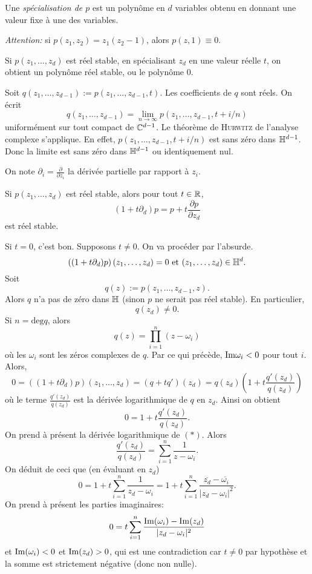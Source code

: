 Une \emph{spécialisation de $p$} est un polynôme en $d$ variables obtenu en
donnant une valeur fixe à une des variables.

\emph{Attention:} si $p(z_1, z_2) = z_1(z_2-1)$, alors $p(z, 1) \equiv 0$.

\begin{prop}
  \label{prop:2}
  Si $p(z_1, \ldots, z_d)$ est réel stable, en spécialisant $z_d$ en une valeur réelle $t$, on obtient un
  polynôme réel stable, ou le polynôme $0$.
\end{prop}

\begin{preuve}
  Soit $q(z_1, \ldots, z_{d-1}) := p(z_1, \ldots, z_{d-1}, t)$. Les coefficients de $q$ sont réels. On écrit
  \[q(z_1, \ldots, z_{d-1}) = \lim_{n \to \infty} p(z_1, \ldots, z_{d-1}, t + i/n) \]
  uniformément sur tout compact de $\mathbb{C}^{d-1}$. Le théorème de \textsc{Hurwitz} de l'analyse complexe
  s'applique. En effet, $p(z_1, \ldots, z_{d-1}, t + i/n)$ est sans zéro dans $\mathbb{H}^{d-1}$. Donc la limite est
  sans zéro dans $\mathbb{H}^{d-1}$ ou identiquement nul.
\end{preuve}


On note $\partial_i = \frac{\partial}{\partial z_i}$ la dérivée partielle par rapport à $z_i$.


\begin{prop}
  \label{prop:3}
  Si $p(z_1, \ldots, z_d)$ est réel stable, alors pour tout $t \in \mathbb{R}$, 
  \[ (1 + t \partial_d)p = p + t \frac{\partial p}{\partial z_d} \]
  est réel stable.
\end{prop}


\begin{preuve}
  Si $t = 0$, c'est bon. Supposons $t \neq 0$. On va procéder par l'absurde. 
  \[ \left( (1 + t\partial_d)p \right)(z_1, \ldots, z_d) = 0 \text{ et } (z_1, \ldots, z_d) \in \mathbb{H}^{d}.\]
  Soit 
  \[ q(z):= p(z_1, \ldots, z_{d-1}, z). \]
  Alors $q$ n'a pas de zéro dans $\mathbb{H}$ (sinon $p$ ne serait pas réel stable). En particulier, 
  \[ q(z_d) \neq 0. \]
  Si $n = \mathrm{deg} q$, alors 
  \[ q(z) = \prod_{i = 1}^{n} (z-\omega_i) \tag{$\ast$}\]
  où les $\omega_i$ sont les zéros complexes de $q$. Par ce qui précède, $\mathrm{Im} \omega_i < 0$ pour tout
  $i$. Alors, 
  \[ 0 = \left((1 + t \partial_d)p\right)(z_1, \ldots, z_d) = (q + tq')(z_d) = q(z_d) \left(1 + t
      \frac{q'(z_d)}{q(z_d)}\right) \]
  où le terme $\frac{q'(z_d)}{q(z_d)}$ est la dérivée logarithmique de $q$ en
  $z_d$. Ainsi on obtient 
  \[ 0 = 1 + t \frac{q'(z_d)}{q(z_d)}.\]
  On prend à présent la dérivée logarithmique de $(\ast)$. Alors 
  \[ \frac{q'(z_d)}{q(z_d)} = \sum_{i = 1}^{n} \frac{1}{z- \omega_i}. \]
  On déduit de ceci que (en évaluant en $z_d$)
  \[ 0 = 1 + t \sum_{i = 1}^{n} \frac{1}{z_d - \omega_i} = 1 + t \sum_{i = 1}^{n} \frac{\overline{z_d} -
      \overline{\omega_i}}{|z_d - \omega_i|^2}. \]
  On prend à présent les parties imaginaires: 
  \[ 0 = t \sum_{i = 1}^{n} \frac{\mathrm{Im}(\omega_i) - \mathrm{Im}(z_d)}{|z_d - \omega_i|^2} \]
  et $\mathrm{Im}(\omega_i) < 0$ et $\mathrm{Im}(z_d) > 0$, qui est une contradiction car $t \neq 0$ par hypothèse et la somme
  est strictement négative (donc non nulle).
\end{preuve}


